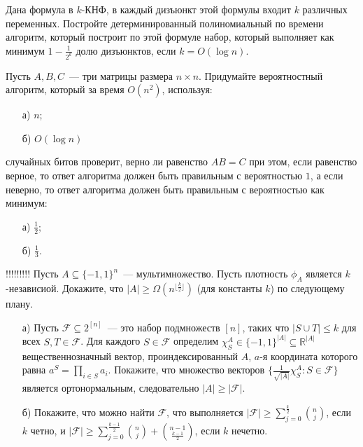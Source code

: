 \begin{task}
	Дана формула в $k$-КНФ, в каждый дизъюнкт этой формулы входит $k$ различных переменных. Постройте детерминированный
    полиномиальный по времени алгоритм, который построит по этой формуле набор, который выполняет как минимум $1 - \frac1{2^k}$
    долю дизъюнктов, если $k = O(\log n)$.
\end{task}

\begin{task}
	Пусть $A, B, C$~--- три матрицы размера $n \times n$. Придумайте вероятностный алгоритм, который за время $O(n^2)$, используя:
    \begin{enumerate}[topsep = 0pt, itemsep = -1ex]
        \item [а)] $n$;
        \item [б)] $O(\log n)$
	\end{enumerate}
	случайных битов проверит, верно ли равенство $A B = C$ при этом, если равенство верное, то ответ алгоритма должен быть
    правильным с вероятностью $1$, а если неверно, то ответ алгоритма должен быть правильным с вероятностью как минимум:
    \begin{enumerate}[topsep = 0pt, itemsep = -1ex]
        \item [а)] $\frac{1}{2}$;
        \item [б)] $\frac{1}{3}$.
	\end{enumerate}
\end{task}


\begin{task}{!!!!!!!!!}
    Пусть $A \subseteq \{-1, 1\}^n$~--- мультимножество. Пусть плотность $\phi_A$ является $k$-независиой. Докажите, что $|A| \geq
    \Omega(n^{\lfloor \frac{k}{2} \rfloor})$ (для константы $k$) по следующему плану.
    \begin{enumerate}[topsep = 0pt, itemsep = -1ex]
        \item [а)] Пусть $\mathcal{F} \subseteq 2^{[n]}$~--- это набор подмножеств $[n]$, таких что $|S \cup T| \leq k$ для всех
			$S, T \in \mathcal{F}$. Для каждого $S \in \mathcal{F}$ определим $\chi_S^A \in \{-1, 1\}^{|A|} \subseteq
            \mathbb{R}^{|A|}$ вещественнозначный вектор, проиндексированный $A$, $a$-я координата которого равна $a^{S} =
            \prod_{i \in S} a_i$. Покажите, что множество векторов $\{\frac{1}{\sqrt{|A|}} \chi_S^A: S \in \mathcal{F}\}$ является
            ортонормальным, следовательно $|A| \geq |\mathcal{F}|$.
        \item [б)] Покажите, что можно найти $\mathcal{F}$, что выполняется $|\mathcal{F}| \geq \sum\limits_{j = 0}^{\frac{k}{2}}
    		\binom{n}{j}$, если $k$ четно, и $|\mathcal{F}| \geq \sum\limits_{j = 0}^{\frac{k - 1}{2}} \binom{n}{j} +
			\binom{n - 1}{\frac{k - 1}{2}}$, если $k$ нечетно.
	\end{enumerate}
\end{task}



